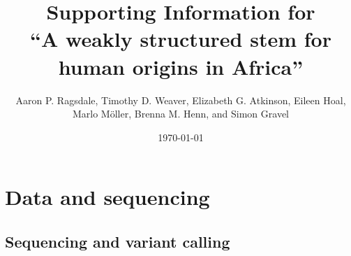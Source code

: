 \documentclass[]{article}
\begin{document}
\title{Supporting Information for\\
``A weakly structured stem for human origins in Africa''}
\author{Aaron P. Ragsdale, Timothy D. Weaver, Elizabeth G. Atkinson, Eileen Hoal, Marlo M\"{o}ller, Brenna M. Henn, and Simon Gravel}
\date{\normalsize \today}
\maketitle

\renewcommand{\thefigure}{S\arabic{figure}}
\renewcommand{\thetable}{S\arabic{table}}
\renewcommand{\theequation}{S\arabic{equation}}
\setcounter{figure}{0}
\setcounter{table}{0}
\setcounter{equation}{0}

\small
\tableofcontents
\normalsize

\section{Data and sequencing}

\subsection{Sequencing and variant calling}
\end{document}
